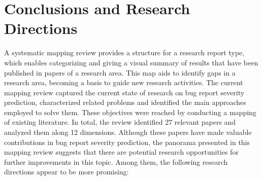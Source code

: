 \section{Conclusions and Research Directions}\label{sec:conclusions}

A systematic mapping review provides a structure for a research report type, which enables categorizing and giving a visual summary of results that have been published in papers of a research area\cite{Petersen:2008}. This map aids to identify gaps in a research area, becoming a basis to guide new research activities\cite{Kitchenham:2007}. The current mapping review captured the current state of research on bug report severity prediction, characterized related problems and identified the main approaches employed to solve them. These objectives were reached by conducting a mapping of existing literature. In total, the review identified 27 relevant papers and analyzed them along 12 dimensions. Although these papers have made valuable contributions in bug report severity prediction, the panorama presented in this mapping review suggests that there are potential research opportunities for further improvements in this topic. Among them, the following research directions appear to be more promising:

